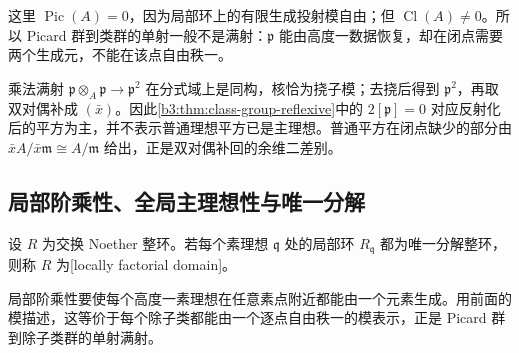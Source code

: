 这里 \(\operatorname{Pic}(A)=0\)，因为局部环上的有限生成投射模自由；但 \(\operatorname{Cl}(A)\ne0\)。所以 Picard 群到类群的单射一般不是满射：\(\mathfrak p\) 能由高度一数据恢复，却在闭点需要两个生成元，不能在该点自由秩一。

\ProseParagraphBreak
乘法满射 \(\mathfrak p\otimes_A\mathfrak p\to\mathfrak p^2\) 在分式域上是同构，核恰为挠子模；去挠后得到 \(\mathfrak p^2\)，再取双对偶补成 \((\bar x)\)。因此\cref{b3:thm:class-group-reflexive}中的 \(2[\mathfrak p]=0\) 对应反射化后的平方为主，并不表示普通理想平方已是主理想。普通平方在闭点缺少的部分由 \(\bar xA/\bar x\mathfrak m\cong A/\mathfrak m\) 给出，正是双对偶补回的余维二差别。

\subsection{局部阶乘性、全局主理想性与唯一分解}
\label{b3:subsec:2005:04}

\begin{definition}\label{b3:def:locally-factorial-domain}
	设 \(R\) 为交换 Noether 整环。若每个素理想 \(\mathfrak q\) 处的局部环 \(R_{\mathfrak q}\) 都为唯一分解整环，则称 \(R\) 为[locally factorial domain]。
\end{definition}

局部阶乘性要使每个高度一素理想在任意素点附近都能由一个元素生成。用前面的模描述，这等价于每个除子类都能由一个逐点自由秩一的模表示，正是 Picard 群到除子类群的单射满射。

